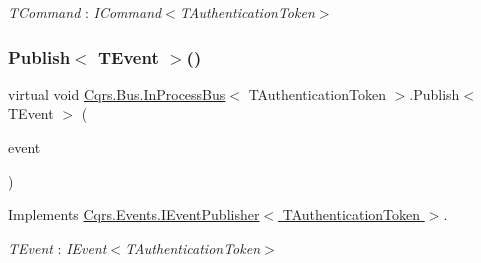 \begin{Desc}
\item[Type Constraints]\begin{description}
\item[{\em T\+Command} : {\em I\+Command$<$T\+Authentication\+Token$>$}]\end{description}
\end{Desc}
\mbox{\label{classCqrs_1_1Bus_1_1InProcessBus_afd3d41a5f27a985e9d6ccf3f6f77f11a_afd3d41a5f27a985e9d6ccf3f6f77f11a}} 
\subsubsection{\texorpdfstring{Publish$<$ T\+Event $>$()}{Publish< TEvent >()}\hspace{0.1cm}{\footnotesize\ttfamily [1/2]}}
{\footnotesize\ttfamily virtual void \hyperlink{classCqrs_1_1Bus_1_1InProcessBus}{Cqrs.\+Bus.\+In\+Process\+Bus}$<$ T\+Authentication\+Token $>$.Publish$<$ T\+Event $>$ (\begin{DoxyParamCaption}\item[{T\+Event @}]{event }\end{DoxyParamCaption})\hspace{0.3cm}{\ttfamily [virtual]}}



Implements \hyperlink{interfaceCqrs_1_1Events_1_1IEventPublisher_a02f0db0bc9b3aa1c7f766f58f8422ee3_a02f0db0bc9b3aa1c7f766f58f8422ee3}{Cqrs.\+Events.\+I\+Event\+Publisher$<$ T\+Authentication\+Token $>$}.

\begin{Desc}
\item[Type Constraints]\begin{description}
\item[{\em T\+Event} : {\em I\+Event$<$T\+Authentication\+Token$>$}]\end{description}
\end{Desc}
\mbox{\label{classCqrs_1_1Bus_1_1InProcessBus_ae154f274db2a028a6094677d83cc1c74_ae154f274db2a028a6094677d83cc1c74}} 
